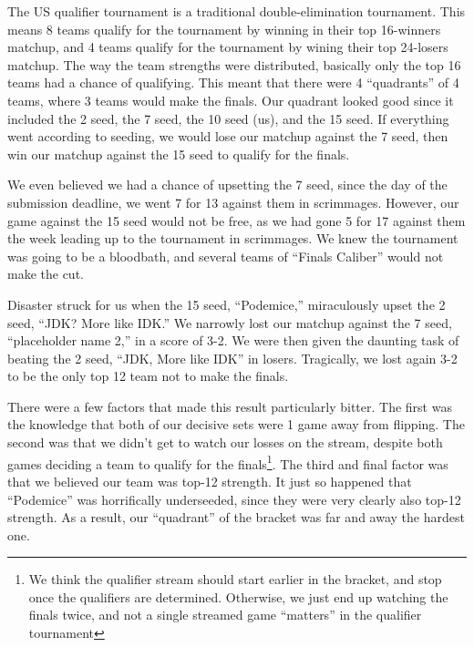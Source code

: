 \medskip

The US qualifier tournament is a traditional double-elimination tournament. This means 8 teams qualify for the tournament by winning in their top 16-winners matchup, and 4 teams qualify for the tournament by wining their top 24-losers matchup. The way the team strengths were distributed, basically only the top 16 teams had a chance of qualifying. This meant that there were 4 ``quadrants'' of 4 teams, where 3 teams would make the finals. Our quadrant looked good since it included the 2 seed, the 7 seed, the 10 seed (us), and the 15 seed. If everything went according to seeding, we would lose our matchup against the 7 seed, then win our matchup against the 15 seed to qualify for the finals.

\medskip

We even believed we had a chance of upsetting the 7 seed, since the day of the submission deadline, we went 7 for 13 against them in scrimmages. However, our game against the 15 seed would not be free, as we had gone 5 for 17 against them the week leading up to the tournament in scrimmages. We knew the tournament was going to be a bloodbath, and several teams of ``Finals Caliber'' would not make the cut.

\medskip

Disaster struck for us when the 15 seed, ``Podemice,'' miraculously upset the 2 seed, ``JDK? More like IDK.'' We narrowly lost our matchup against the 7 seed, ``placeholder name 2,'' in a score of 3-2. We were then given the daunting task of beating the 2 seed, ``JDK, More like IDK'' in losers. Tragically, we lost again 3-2 to be the only top 12 team not to make the finals.


There were a few factors that made this result particularly bitter. The first was the knowledge that both of our decisive sets were 1 game away from flipping. The second was that we didn't get to watch our losses on the stream, despite both games deciding a team to qualify for the finals\footnote{We think the qualifier stream should start earlier in the bracket, and stop once the qualifiers are determined. Otherwise, we just end up watching the finals twice, and not a single streamed game ``matters'' in the qualifier tournament}. The third and final factor was that we believed our team was top-12 strength. It just so happened that ``Podemice'' was horrifically underseeded, since they were very clearly also top-12 strength. As a result, our ``quadrant'' of the bracket was far and away the hardest one.

